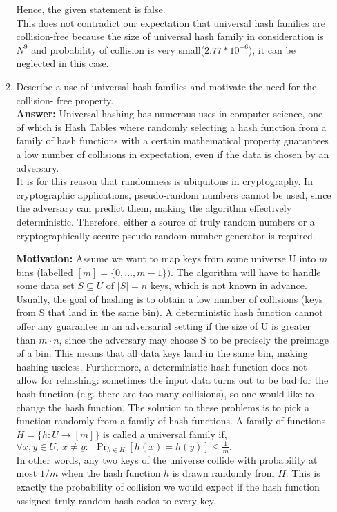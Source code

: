 \documentclass[12pt]{article}
\begin{document}
\begin{enumerate}
\begin{enumerate}
Hence, the given statement is false.\\
This does not contradict our expectation that universal hash families are collision-free because the size of universal hash family in consideration is $N^9$ and probability of collision is very small($2.77*10^{-6}$), it can be neglected in this case. 
\item Describe a use of universal hash families and motivate the need for the collision- free property.\\
\textbf{Answer:} Universal hashing has numerous uses in computer science, one of which is Hash Tables where randomly selecting a hash function from a family of hash functions with a certain mathematical property guarantees a low number of collisions in expectation, even if the data is chosen by an adversary. \\
It is for this reason that randomness is ubiquitous in cryptography. In cryptographic applications, pseudo-random numbers cannot be used, since the adversary can predict them, making the algorithm effectively deterministic. Therefore, either a source of truly random numbers or a cryptographically secure pseudo-random number generator is required.

\textbf{Motivation:}
Assume we want to map keys from some universe U into $m$ bins (labelled $[m] = \{0, \dots, m-1\})$. The algorithm will have to handle some data set $S \subseteq U$ of $|S|=n$ keys, which is not known in advance. Usually, the goal of hashing is to obtain a low number of collisions (keys from S that land in the same bin). A deterministic hash function cannot offer any guarantee in an adversarial setting if the size of U is greater than $m \cdot n$, since the adversary may choose S to be precisely the preimage of a bin. This means that all data keys land in the same bin, making hashing useless. Furthermore, a deterministic hash function does not allow for rehashing: sometimes the input data turns out to be bad for the hash function (e.g. there are too many collisions), so one would like to change the hash function.
The solution to these problems is to pick a function randomly from a family of hash functions. A family of functions\\
$ H = \{ h : U \to [m] \}$ is called a universal family if, \\ 
$\displaystyle{\forall x, y \in U, ~ x\ne y: ~~ \Pr_{h\in H} [h(x) = h(y)] \le \frac{1}{m}.}$\\
In other words, any two keys of the universe collide with probability at most $1/m$ when the hash function $h$ is drawn randomly from $H$. This is exactly the probability of collision we would expect if the hash function assigned truly random hash codes to every key.
\end{enumerate}

\end{enumerate}
\pagebreak
\end{document}
